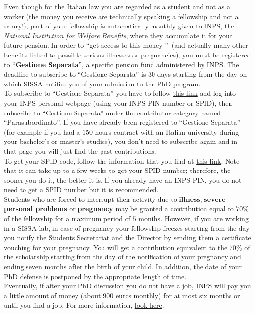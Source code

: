 \documentclass{sissavademecum}
\begin{document}
Even though for the Italian law you are regarded as a student and not as a worker (the money you receive are technically speaking a fellowship and not a salary!), part of your fellowship is automatically monthly given to INPS, the \emph{National Institution for Welfare Benefits}, where they accumulate it for your future pension. In order to \textquotedblleft get access to this money \textquotedblright\, (and actually many other benefits linked to possible serious illnesses or pregnancies), you must be registered to ``\textbf{Gestione Separata}'', a specific pension fund administered by INPS. The deadline to subscribe to ``Gestione Separata'' is $30$ days starting from the day on which SISSA notifies you of your admission to the PhD program. \\
\indent To subscribe to ``Gestione Separata'' you have to follow \href{https://www.inps.it/myinps/default.aspx?accessoinps=1}{this link} and log into your INPS personal webpage (using your INPS PIN number or SPID), then subscribe to ``Gestione Separata'' under the contributor category named ``Parasubordinato''. If you have already been registered to ``Gestione Separata'' (for example if you had a $150$-hours contract with an Italian university during your bachelor's or master's studies), you don't need to subscribe again and in that page you will just find the past contributions. \\
\indent To get your SPID code, follow the information that you find at \href{https://www.spid.gov.it/en/}{this link}. Note that it can take up to a few weeks to get your SPID number; therefore, the sooner you do it, the better it is. If you already have an INPS PIN, you do not need to get a SPID number but it is recommended. \\
\indent Students who are forced to interrupt their activity due to \textbf{illness}, \textbf{severe personal problems} or \textbf{pregnancy} may be granted a contribution equal to $70\%$ of the fellowship for a maximum period of $5$ months. However, if you are working in a SISSA lab, in case of pregnancy your fellowship freezes starting from the day you notify the Students Secretariat and the Director by sending them a certificate vouching for your pregnancy. You will get a contribution equivalent to the $70\%$ of the scholarship starting from the day of the notification of your pregnancy and ending seven months after the birth of your child. In addition, the date of your PhD defense is postponed by the appropriate length of time. \\
\indent Eventually, if after your PhD discussion you do not have a job, INPS will pay you a little amount of money (about 900 euros monthly) for at most six months or until you find a job. For more information, \href{https://www.inps.it/prestazioni-servizi/dis-coll-indennita-mensile-di-disoccupazione/}{look here}. 
\end{document}
